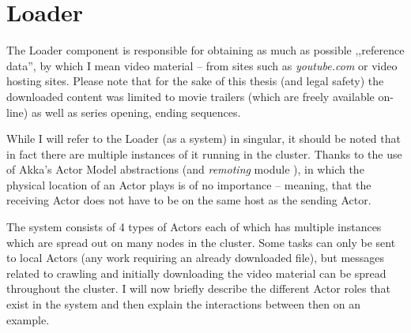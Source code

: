\section{Loader}
The Loader component is responsible for obtaining as much as possible ,,reference data'', by which I mean video material -- from sites such as \textit{youtube.com} or video hosting sites. Please note that for the sake of this thesis (and legal safety) the downloaded content was limited to movie trailers (which are freely available on-line) as well as series opening, ending sequences.

While I will refer to the Loader (as a system) in singular, it should be noted that in fact there are multiple instances of it running in the cluster.
Thanks to the use of Akka's \cite{akka-docs} Actor Model abstractions (and \textit{remoting} module \cite{akka-remoting}), in which the physical location of an Actor plays is of no importance -- meaning, that the receiving Actor does not have to be on the same host as the sending Actor.

The system consists of 4 types of Actors each of which has multiple instances which are spread out on many nodes in the cluster.
Some tasks can only be sent to local Actors (any work requiring an already downloaded file), but messages related to crawling and initially downloading
the video material can be spread throughout the cluster. I will now briefly describe the different Actor roles that exist in the system and then explain the interactions between then on an example.

